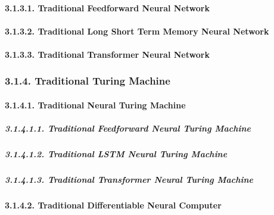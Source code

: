 \documentclass[
]{article}
\begin{document}
\hypertarget{traditional-feedforward-neural-network-1}{%
\paragraph{3.1.3.1. Traditional Feedforward Neural
Network}\label{traditional-feedforward-neural-network-1}}

\hypertarget{traditional-long-short-term-memory-neural-network-1}{%
\paragraph{3.1.3.2. Traditional Long Short Term Memory Neural
Network}\label{traditional-long-short-term-memory-neural-network-1}}

\hypertarget{traditional-transformer-neural-network-1}{%
\paragraph{3.1.3.3. Traditional Transformer Neural
Network}\label{traditional-transformer-neural-network-1}}

\hypertarget{traditional-turing-machine-1}{%
\subsubsection{3.1.4. Traditional Turing
Machine}\label{traditional-turing-machine-1}}

\hypertarget{traditional-neural-turing-machine-1}{%
\paragraph{3.1.4.1. Traditional Neural Turing
Machine}\label{traditional-neural-turing-machine-1}}

\hypertarget{traditional-feedforward-neural-turing-machine-1}{%
\subparagraph{3.1.4.1.1. Traditional Feedforward Neural Turing
Machine}\label{traditional-feedforward-neural-turing-machine-1}}

\hypertarget{traditional-lstm-neural-turing-machine-1}{%
\subparagraph{3.1.4.1.2. Traditional LSTM Neural Turing
Machine}\label{traditional-lstm-neural-turing-machine-1}}

\hypertarget{traditional-transformer-neural-turing-machine-1}{%
\subparagraph{3.1.4.1.3. Traditional Transformer Neural Turing
Machine}\label{traditional-transformer-neural-turing-machine-1}}

\hypertarget{traditional-differentiable-neural-computer-1}{%
\paragraph{3.1.4.2. Traditional Differentiable Neural
Computer}\label{traditional-differentiable-neural-computer-1}}
\end{document}
